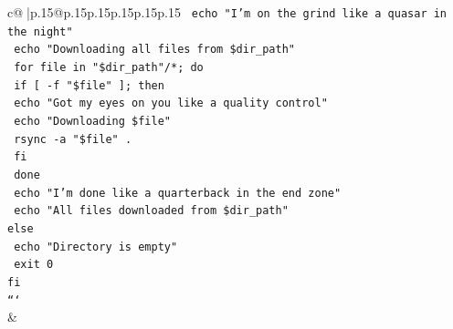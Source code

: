 \documentclass{article}
\begin{document}
{\begin{supertabular}{c@{$\;$}|p{.15\linewidth}@{}p{.15\linewidth}p{.15\linewidth}p{.15\linewidth}p{.15\linewidth}p{.15\linewidth}}
{{{\texttt{  echo "I'm on the grind like a quasar in the night"} \\
\texttt{  echo "Downloading all files from \$dir\_path"} \\
\texttt{  for file in "\$dir\_path"/*; do} \\
\texttt{    if {[} {-}f "\$file" {]}; then} \\
\texttt{      echo "Got my eyes on you like a quality control"} \\
\texttt{      echo "Downloading \$file"} \\
\texttt{      rsync {-}a "\$file" .} \\
\texttt{    fi} \\
\texttt{  done} \\
\texttt{  echo "I'm done like a quarterback in the end zone"} \\
\texttt{  echo "All files downloaded from \$dir\_path"} \\
\texttt{else} \\
\texttt{  echo "Directory is empty"} \\
\texttt{  exit 0} \\
\texttt{fi} \\
\texttt{```} \\
            }
        }
    }
    & \\ \\

\end{supertabular}
}
\end{document}
